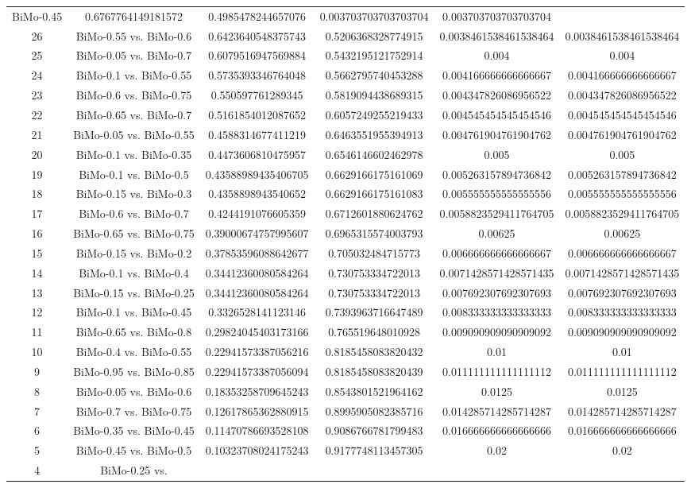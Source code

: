 \documentclass[a4paper,10pt]{article}
\begin{document}
\begin{landscape}
\begin{table}[!htp]
\begin{tabular}{cccccc}
BiMo-0.45&0.6767764149181572&0.4985478244657076&0.003703703703703704&0.003703703703703704\\26&BiMo-0.55 vs. BiMo-0.6&0.6423640548375743&0.5206368328774915&0.0038461538461538464&0.0038461538461538464\\25&BiMo-0.05 vs. BiMo-0.7&0.6079516947569884&0.5432195121752914&0.004&0.004\\24&BiMo-0.1 vs. BiMo-0.55&0.5735393346764048&0.5662795740453288&0.004166666666666667&0.004166666666666667\\23&BiMo-0.6 vs. BiMo-0.75&0.550597761289345&0.5819094438689315&0.004347826086956522&0.004347826086956522\\22&BiMo-0.65 vs. BiMo-0.7&0.5161854012087652&0.6057249255219433&0.004545454545454546&0.004545454545454546\\21&BiMo-0.05 vs. BiMo-0.55&0.4588314677411219&0.6463551955394913&0.004761904761904762&0.004761904761904762\\20&BiMo-0.1 vs. BiMo-0.35&0.4473606810475957&0.6546146602462978&0.005&0.005\\19&BiMo-0.1 vs. BiMo-0.5&0.43588989435406705&0.6629166175161069&0.005263157894736842&0.005263157894736842\\18&BiMo-0.15 vs. BiMo-0.3&0.4358898943540652&0.6629166175161083&0.005555555555555556&0.005555555555555556\\17&BiMo-0.6 vs. BiMo-0.7&0.4244191076605359&0.6712601880624762&0.0058823529411764705&0.0058823529411764705\\16&BiMo-0.65 vs. BiMo-0.75&0.39000674757995607&0.6965315574003793&0.00625&0.00625\\15&BiMo-0.15 vs. BiMo-0.2&0.37853596088642677&0.705032484715773&0.006666666666666667&0.006666666666666667\\14&BiMo-0.1 vs. BiMo-0.4&0.34412360080584264&0.730753334722013&0.0071428571428571435&0.0071428571428571435\\13&BiMo-0.15 vs. BiMo-0.25&0.34412360080584264&0.730753334722013&0.007692307692307693&0.007692307692307693\\12&BiMo-0.1 vs. BiMo-0.45&0.3326528141123146&0.7393963716647489&0.008333333333333333&0.008333333333333333\\11&BiMo-0.65 vs. BiMo-0.8&0.29824045403173166&0.765519648010928&0.009090909090909092&0.009090909090909092\\10&BiMo-0.4 vs. BiMo-0.55&0.22941573387056216&0.8185458083820432&0.01&0.01\\9&BiMo-0.95 vs. BiMo-0.85&0.22941573387056094&0.8185458083820439&0.011111111111111112&0.011111111111111112\\8&BiMo-0.05 vs. BiMo-0.6&0.18353258709645243&0.8543801521964162&0.0125&0.0125\\7&BiMo-0.7 vs. BiMo-0.75&0.12617865362880915&0.8995905082385716&0.014285714285714287&0.014285714285714287\\6&BiMo-0.35 vs. BiMo-0.45&0.11470786693528108&0.9086766781799483&0.016666666666666666&0.016666666666666666\\5&BiMo-0.45 vs. BiMo-0.5&0.10323708024175243&0.9177748113457305&0.02&0.02\\4&BiMo-0.25 vs. 
\end{tabular}
\end{table}
\end{landscape}
\end{document}
